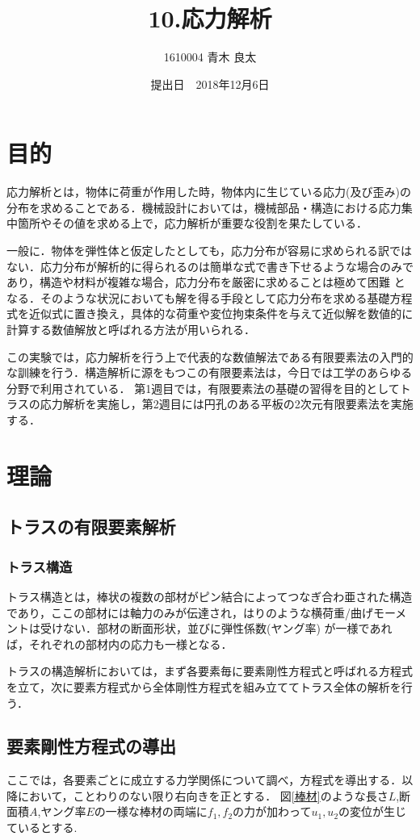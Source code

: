 \documentclass[a4paper,11pt,uplatex]{jsarticle}
\title{10.応力解析}
\author{1610004 青木 良太}
\date{提出日　2018年12月6日} %
\begin{document}
\maketitle

\section{目的}
応力解析とは，物体に荷重が作用した時，物体内に生じている応力(及び歪み)の分布を求めることである．機械設計においては，機械部品・構造における応力集中箇所やその値を求める上で，応力解析が重要な役割を果たしている．
\par
一般に．物体を弾性体と仮定したとしても，応力分布が容易に求められる訳ではない．応力分布が解析的に得られるのは簡単な式で書き下せるような場合のみであり，構造や材料が複雑な場合，応力分布を厳密に求めることは極めて困難
となる．そのような状況においても解を得る手段として応力分布を求める基礎方程式を近似式に置き換え，具体的な荷重や変位拘束条件を与えて近似解を数値的に計算する数値解放と呼ばれる方法が用いられる．
\par
この実験では，応力解析を行う上で代表的な数値解法である有限要素法の入門的な訓練を行う．構造解析に源をもつこの有限要素法は，今日では工学のあらゆる分野で利用されている．
第1週目では，有限要素法の基礎の習得を目的としてトラスの応力解析を実施し，第2週目には円孔のある平板の2次元有限要素法を実施する．

\section{理論}
\subsection{トラスの有限要素解析}
\subsubsection{トラス構造}
トラス構造とは，棒状の複数の部材がピン結合によってつなぎ合わ亜された構造であり，ここの部材には軸力のみが伝達され，はりのような横荷重/曲げモーメントは受けない．部材の断面形状，並びに弾性係数(ヤング率)
が一様であれば，それぞれの部材内の応力も一様となる．
\par
トラスの構造解析においては，まず各要素毎に要素剛性方程式と呼ばれる方程式を立て，次に要素方程式から全体剛性方程式を組み立ててトラス全体の解析を行う．
\subsection{要素剛性方程式の導出}
ここでは，各要素ごとに成立する力学関係について調べ，方程式を導出する．以降において，ことわりのない限り右向きを正とする．
図\ref{棒材}のような長さ$L$,断面積$A$,ヤング率$E$の一様な棒材の両端に$f_1,f_2$の力が加わって$u_1,u_2$の変位が生じているとする.
\end{document}
